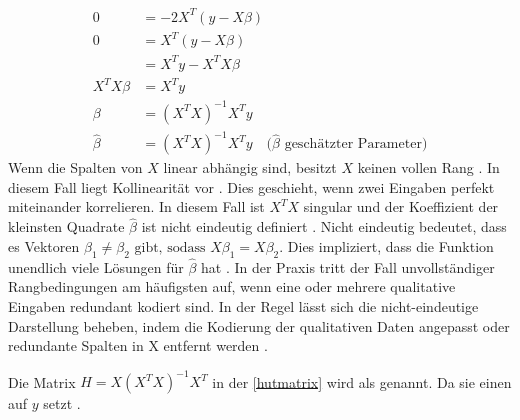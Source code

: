 \begin{equation}
\begin{aligned}
0 &= -2 X^T (y - X\beta) \quad  \\
0 &= X^T (y - X\beta) \quad  \\
  &= X^T y - X^T X \beta \\
X^T X \beta &= X^T y \\
\beta &= (X^T X)^{-1} X^T y \\
\hat{\beta} &= (X^T X)^{-1} X^T y \quad \text{($\hat{\beta}$ geschätzter Parameter)}
\end{aligned}
\label{XTXderived}
\end{equation}
Wenn die Spalten von \( X \) linear abhängig sind, besitzt \( X \) keinen vollen Rang \cite{hastie2009elements}. In diesem Fall liegt Kollinearität vor \cite{Maronna2019Robust}. Dies geschieht, wenn zwei Eingaben perfekt miteinander korrelieren. In diesem Fall ist \(X^TX\) singular und der Koeffizient der kleinsten Quadrate $\hat{\beta}$ ist nicht eindeutig definiert \cite{hastie2009elements}. Nicht eindeutig bedeutet, dass es Vektoren \(\beta_1 \neq \beta_2 \text{ gibt, sodass } X\beta_1 = X\beta_2\). Dies impliziert, dass die Funktion unendlich viele Lösungen für $\hat{\beta}$ hat \cite{Maronna2019Robust}. In der Praxis tritt der Fall unvollständiger Rangbedingungen am häufigsten auf, wenn eine oder mehrere qualitative Eingaben redundant kodiert sind. In der Regel lässt sich die nicht-eindeutige Darstellung beheben, indem die Kodierung der qualitativen Daten angepasst oder redundante Spalten in X entfernt werden \cite{hastie2009elements}. \par
Die Matrix \( H = X (X^T X)^{-1} X^T \) in der \autoref{hutmatrix} wird als  genannt. Da sie einen  auf \(y\) setzt \cite{huber1981robust}. 

